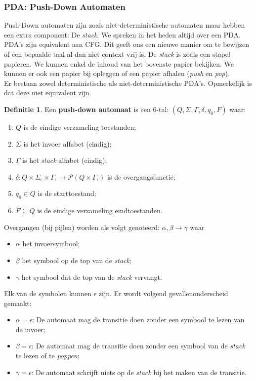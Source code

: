 \documentclass[12pt,a4paper]{article}
\theoremstyle{definition}
\newtheorem{defi}{Definitie}[section]
\newcommand{\ra}{\ensuremath{\rightarrow}}
\begin{document}
	\subsubsection{PDA: Push-Down Automaten}
	Push-Down automaten zijn zoals niet-deterministische automaten maar hebben een extra component: De \textit{stack}. We spreken in het heden altijd over een PDA. PDA's zijn equivalent aan CFG. Dit geeft ons een nieuwe manier om te bewijzen of een bepaalde taal al dan niet context vrij is. De \textit{stack} is zoals een stapel papieren. We kunnen enkel de inhoud van het bovenste papier bekijken. We kunnen er ook een papier bij opleggen of een papier afhalen (\textit{push} en \textit{pop}).\\
	
	Er bestaan zowel deterministische als niet-deterministische PDA's. Opmerkelijk is dat deze niet equivalent zijn.\\
	\begin{defi}
		Een \textbf{push-down automaat} is een 6-tal: $(Q,\Sigma,\Gamma,\delta,q_0,F)$ waar: \begin{enumerate}
			\item $Q$ is de eindige verzameling toestanden;
			\item $\Sigma$ is het invoer alfabet (eindig);
			\item $\Gamma$ is het \textit{stack} alfabet (eindig);
			\item $\delta : Q\times \Sigma_\epsilon \times \Gamma_\epsilon \ra \mathcal{P}(Q\times \Gamma_\epsilon)$ is de overgangsfunctie;
			\item $q_0 \in Q$ is de starttoestand;
			\item $F\subseteq Q$ is de eindige verzameling eindtoestanden.  
		\end{enumerate}
	\end{defi}
	Overgangen (bij pijlen) worden als volgt genoteerd: $\alpha,\beta \ra \gamma$ waar \begin{itemize}
		\item $\alpha$ het invoersymbool;
		\item $\beta$ het symbool op de top van de \textit{stack};
		\item $\gamma$ het symbool dat de top van de \textit{stack} vervangt.
	\end{itemize}
	Elk van de symbolen kunnen $\epsilon$ zijn. Er wordt volgend gevallenonderscheid gemaakt: \begin{itemize}
		\item $\alpha = \epsilon$: De automaat mag de transitie doen zonder een symbool te lezen van de invoer;
		\item $\beta = \epsilon$: De automaat mag de transitie doen zonder een symbool van de \textit{stack} te lezen of te \textit{poppen};
		\item $\gamma = \epsilon$: De automaat schrijft niets op de \textit{stack} bij het maken van de transitie.
	\end{itemize}
	
\end{document}
